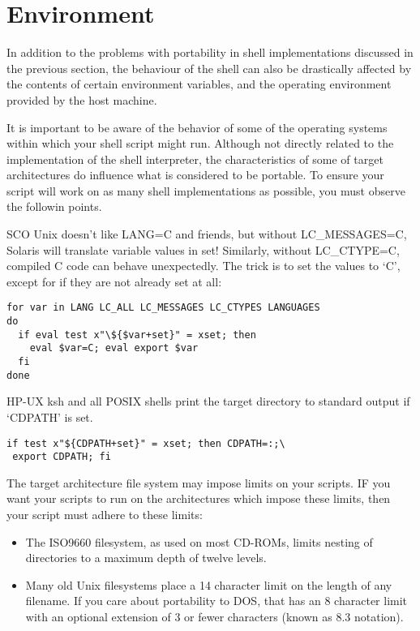 \section{Environment}

In addition to the problems with portability in shell implementations discussed in the previous section, the behaviour of the shell can also be drastically affected by the contents of certain environment variables, and the operating environment provided by the host machine.

It is important to be aware of the behavior of some of the operating systems within which your shell script might run. Although not directly related to the implementation of the shell interpreter, the characteristics of some of target architectures do influence what is considered to be portable. To ensure your script will work on as many shell implementations as possible, you must observe the followin points.

SCO Unix doesn't like LANG=C and friends, but without LC\_{}MESSAGES=C,
Solaris will translate variable values in set! Similarly,
without LC\_{}CTYPE=C, compiled C code can behave unexpectedly. The trick 
is to set the values to `C', except for if they are not already set at all: 

\begin{Verbatim}[frame=single]
for var in LANG LC_ALL LC_MESSAGES LC_CTYPES LANGUAGES
do
  if eval test x"\${$var+set}" = xset; then
    eval $var=C; eval export $var
  fi
done
\end{Verbatim}

HP-UX ksh and all POSIX shells print the target directory to standard output if `CDPATH' is set.

\begin{Verbatim}[frame=single]
if test x"${CDPATH+set}" = xset; then CDPATH=:;\
 export CDPATH; fi
\end{Verbatim}

The target architecture file system may impose limits on your scripts. IF you want your scripts to run on the architectures which impose these limits, then your script must adhere to these limits:

\begin{itemize}
\item The ISO9660 filesystem, as used on most CD-ROMs, limits nesting of directories to a maximum depth of twelve levels.

\item Many old Unix filesystems place a 14 character limit on the length of any filename. If you care about portability to DOS, that has an 8 character limit with an optional extension of 3 or fewer characters (known as 8.3 notation). 
\end{itemize}

